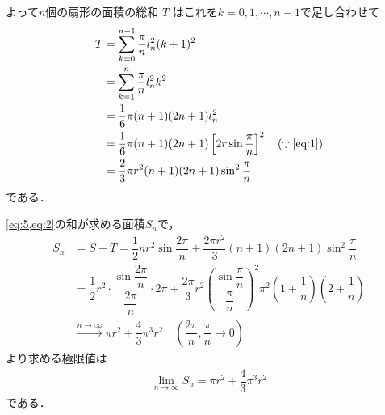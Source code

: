 \documentclass[../../main.tex]{subfiles}
\begin{document}
よって$n$個の扇形の面積の総和 $T$ はこれを$k=0,1,\cdots,n-1$で足し合わせて
\begin{align}
  T
  &= \sum_{k=0}^{n-1} \dfrac{\pi}{n} l_n^2 (k+1)^2  \\
  &= \sum_{k=1}^n \dfrac{\pi}{n} l_n^2 k^2 \\
  &= \dfrac{1}{6} \pi (n+1)(2n+1) l_n^2 \\
  &= \dfrac{1}{6} \pi (n+1)(2n+1) \left[2 r \sin \dfrac{\pi}{n}\right]^2 \quad (\because\text{\cref{eq:1}}) \\
  &= \dfrac{2}{3} \pi r^2 (n+1)(2n+1)\sin^2 \dfrac{\pi}{n} \label{eq:5}
\end{align}
である．

\cref{eq:5,eq:2}の和が求める面積$S_n$で，
\begin{align}
  S_n
  & = S + T
  = \dfrac{1}{2} n r^2 \sin \dfrac{2\pi}{n} + \dfrac{2\pi r^2}{3} (n+1)(2n+1) \sin^2 \dfrac{\pi}{n} \\
  & = \dfrac{1}{2} r^2 \cdot \dfrac{\sin \dfrac{2\pi}{n}}{\dfrac{2\pi}{n}} \cdot 2\pi
  + \dfrac{2\pi}{3} r^2 \left( \dfrac{\sin \dfrac{\pi}{n}}{\dfrac{\pi}{n}} \right)^2 \pi^2
  \left( 1 + \dfrac{1}{n} \right) \left( 2 + \dfrac{1}{n} \right) \\
  &\xrightarrow{n\to\infty} \pi r^2 + \dfrac{4}{3} \pi^3 r^2
  \quad \left(\dfrac{2\pi}{n}, \dfrac{\pi}{n} \to 0 \right)
\end{align}
より求める極限値は
\begin{align}
  \lim_{n\to\infty} S_n = \pi r^2 + \dfrac{4}{3} \pi^3 r^2
\end{align}
である．

\newpage
\end{document}
